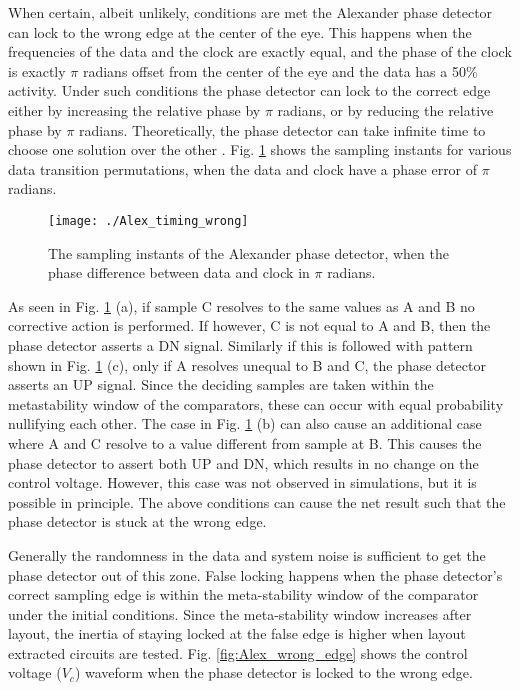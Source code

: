 \documentclass[journal,twoside,letterpaper]{IEEEtran}
\begin{document}
When certain, albeit unlikely, conditions are met the 
Alexander phase detector can lock to the
wrong edge at the center of the eye. This happens when 
the frequencies of the data and the clock 
are exactly equal, and the phase of the 
clock is exactly $\pi$ radians offset from
the center of the eye and the data has a 50\% activity.
Under such conditions the phase detector
can lock to the correct edge either by increasing 
the relative phase by $\pi$ radians,
or by reducing the relative phase by $\pi$ radians. Theoretically, the 
phase detector can take infinite time to choose one solution over 
the other \cite{buridan}.
Fig. \ref{fig:Alex_sample_wrong} shows the sampling instants
for various data transition permutations, when the data
and clock have a phase error of $\pi$ radians.
\begin{figure}[htb!]
\centering
\texttt{[image: ./Alex\_timing\_wrong]}
\caption{The sampling instants of the Alexander phase detector, when 
the phase difference between data and clock in $\pi$ radians.}
\label{fig:Alex_sample_wrong}
\end{figure}
As seen in Fig. \ref{fig:Alex_sample_wrong} (a), if sample
C resolves to the same values as A and B no corrective action is performed.
If however, C is not equal to A and B, then the phase detector asserts
a DN signal. Similarly if this is followed with pattern shown in 
Fig. \ref{fig:Alex_sample_wrong} (c), only if A resolves unequal to 
B and C, the phase detector asserts an UP signal. Since the deciding samples
are taken within the metastability window of the comparators, these can
occur with equal probability nullifying each other. The case in 
Fig. \ref{fig:Alex_sample_wrong} (b) can also cause an additional
case where A and C resolve to a value different from sample at B.
This causes the phase detector to assert both UP and DN, which
results in no change on the control voltage. However, this case
was not observed in simulations, but it is possible in principle.
The above conditions can cause the net result such
that the phase detector is stuck at the wrong edge.

Generally the randomness in the data and system noise is sufficient to 
get the phase detector out of this zone.
False locking happens when the phase detector's correct sampling edge is within the
meta-stability window of the comparator under the initial conditions. Since the
meta-stability window increases after layout, the inertia of staying locked at the false
edge is higher when layout extracted circuits are tested. Fig. \ref{fig:Alex_wrong_edge} shows
the control voltage ($V_c$) waveform when the phase detector is locked to the wrong edge. 
\end{document}
